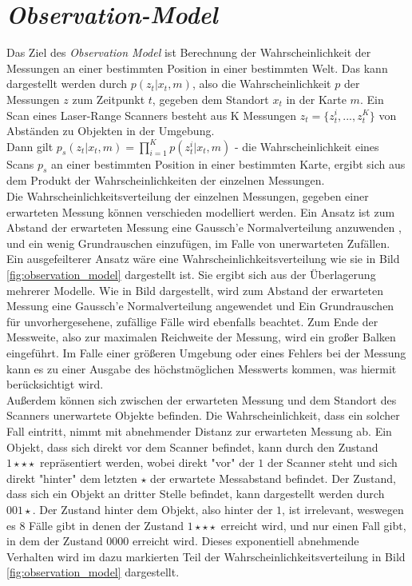 \section{\textit{Observation-Model}}\label{sec:Observation-Model}
Das Ziel des \textit{Observation Model} \cite{youtube:observation_model} ist Berechnung der Wahrscheinlichkeit der Messungen an einer bestimmten Position in einer bestimmten Welt. Das kann dargestellt werden durch $p(z_t|x_t, m)$, also die Wahrscheinlichkeit $p$ der Messungen $z$ zum Zeitpunkt $t$, gegeben dem Standort $x_t$ in der Karte $m$. Ein Scan eines Laser-Range Scanners besteht aus K Messungen $z_t =\{z_t^i, ..., z_t^K\}$ von Abständen zu Objekten in der Umgebung. \\
Dann gilt $p_s(z_t|x_t,m)=\prod_{i=1}^K p(z_t^i|x_t,m)$ - die Wahrscheinlichkeit eines Scans $p_s$ an einer bestimmten Position in einer bestimmten Karte, ergibt sich aus dem Produkt der Wahrscheinlichkeiten der einzelnen Messungen.\\
Die Wahrscheinlichkeitsverteilung der einzelnen Messungen, gegeben einer erwarteten Messung können verschieden modelliert werden. Ein Ansatz ist zum Abstand der erwarteten Messung eine Gaussch'e Normalverteilung anzuwenden , und ein wenig Grundrauschen einzufügen, im Falle von unerwarteten Zufällen. Ein ausgefeilterer Ansatz wäre eine Wahrscheinlichkeitsverteilung wie sie in Bild \ref{fig:observation_model} dargestellt ist. Sie ergibt sich aus der Überlagerung mehrerer Modelle. Wie in Bild dargestellt, wird zum Abstand der erwarteten Messung eine Gaussch'e Normalverteilung angewendet und Ein Grundrauschen für unvorhergesehene, zufällige Fälle wird ebenfalls beachtet. Zum Ende der Messweite, also zur maximalen Reichweite der Messung, wird ein großer Balken eingeführt. Im Falle einer größeren Umgebung oder eines Fehlers bei der Messung kann es zu einer Ausgabe des höchstmöglichen Messwerts kommen, was hiermit berücksichtigt wird.\\
Außerdem können sich zwischen der erwarteten Messung und dem Standort des Scanners unerwartete Objekte befinden. Die Wahrscheinlichkeit, dass ein solcher Fall eintritt, nimmt mit abnehmender Distanz zur erwarteten Messung ab. Ein Objekt, dass sich direkt vor dem Scanner befindet, kann durch den Zustand $1\star\star\star$ repräsentiert werden, wobei direkt "vor" der $1$ der Scanner steht und sich direkt "hinter" dem letzten $\star$ der erwartete Messabstand befindet. Der Zustand, dass sich ein Objekt an dritter Stelle befindet, kann dargestellt werden durch $001\star$. Der Zustand hinter dem Objekt, also hinter der $1$, ist irrelevant, weswegen es 8 Fälle gibt in denen der Zustand $1\star\star\star$ erreicht wird, und nur einen Fall gibt, in dem der Zustand $0000$ erreicht wird. Dieses exponentiell abnehmende Verhalten wird im dazu markierten Teil der Wahrscheinlichkeitsverteilung in Bild \ref{fig:observation_model} dargestellt.\\

